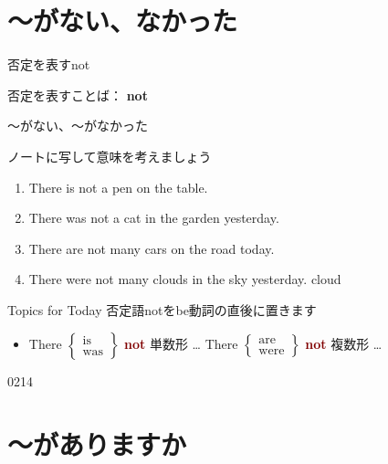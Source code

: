 \documentclass[aspectratio=169,xcolor={dvipsnames,table}]{beamer}
\newcommand{\myaudio}[1]{\href{#1}{\faVolumeUp}}
\begin{document}
\section{～がない、なかった}
\begin{frame}[plain]{否定を表すnot}
 \Large

否定を表すことば： {\LARGE\bfseries not}\hspace{20pt}
\end{frame}
\begin{frame}[plain]{〜がない、～がなかった}

ノートに写して意味を考えましょう

\begin{enumerate}
 \item There is not a pen on the table.
 \item There was not a cat in the garden yesterday.
 \item There are not many cars on the road today.
 \item There were not many clouds in the sky yesterday.%
\hfill{\scriptsize cloud }
\end{enumerate}

\begin{block}{Topics for Today}
否定語notをbe動詞の直後に置きます
\begin{itemize}[square]
 \item There $\left\{\begin{array}{l}\text{is}\\\text{was}\end{array}
\right\}$ \textcolor{Maroon}{\bfseries not} 単数形 \ldots\hspace{40pt}
There $\left\{\begin{array}{l}\text{are}\\\text{were}\end{array}
\right\}$ \textcolor{Maroon}{\bfseries not} 複数形 \ldots
\end{itemize}
\end{block}

\hfill{\tiny 0214}\,{\scriptsize \myaudio{./audio/001_there_is_05.mp3}}
\end{frame}
\section{～がありますか}
\end{document}
